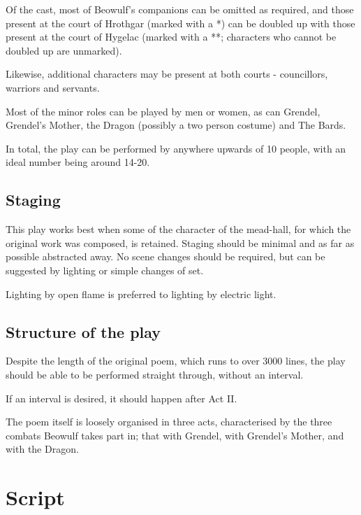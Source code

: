 \documentclass[a4paper]{article}
\begin{document}
Of the cast, most of Beowulf's companions can be omitted as required, and those
present at the court of Hrothgar (marked with a  *) can be doubled up with those present at the court
of Hygelac (marked with a **; characters who cannot be doubled up are unmarked).

Likewise, additional characters may be present at both courts - councillors, warriors and servants.

Most of the minor roles can be played by men or women, as can Grendel, Grendel's
Mother, the Dragon (possibly a two person costume) and The Bards.

In total, the play can be performed by anywhere upwards of 10 people, with an ideal number being around 14-20.

\subsection{Staging}%

This play works best when some of the character of the mead-hall, for which the
original work was composed, is retained. Staging should be minimal and as far as
possible abstracted away. No scene changes should be required, but can be suggested 
by lighting or simple changes of set.

Lighting by open flame is preferred to lighting by electric light.

\subsection{Structure of the play}%

Despite the length of the original poem, which runs to over 3000 lines, the play
should be able to be performed straight through, without an interval.

If an interval is desired, it should happen after Act II.

The poem itself is loosely organised in three acts, characterised by the three 
combats Beowulf takes part in; that with Grendel, with Grendel's Mother, and with the Dragon.

\newpage

\section{Script}
\end{document}
